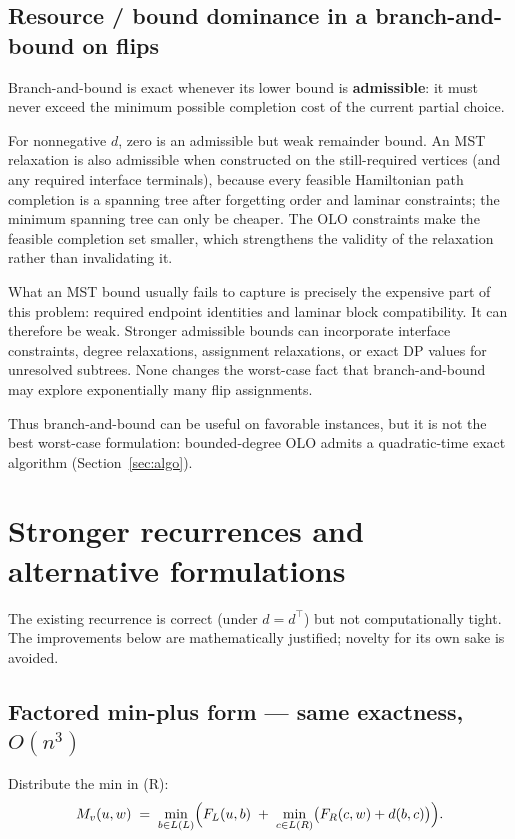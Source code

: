 \documentclass[11pt]{article}
\theoremstyle{plain}
\begin{document}
\subsection{Resource / bound dominance in a branch-and-bound on flips}

Branch-and-bound is exact whenever its lower bound is \textbf{admissible}: it
must never exceed the minimum possible completion cost of the current partial
choice.

For nonnegative \(d\), zero is an admissible but weak remainder bound. An MST
relaxation is also admissible when constructed on the still-required vertices
(and any required interface terminals), because every feasible Hamiltonian path
completion is a spanning tree after forgetting order and laminar constraints;
the minimum spanning tree can only be cheaper. The OLO constraints make the
feasible completion set smaller, which strengthens the validity of the
relaxation rather than invalidating it.

What an MST bound usually fails to capture is precisely the expensive part of
this problem: required endpoint identities and laminar block compatibility. It
can therefore be weak. Stronger admissible bounds can incorporate interface
constraints, degree relaxations, assignment relaxations, or exact DP values for
unresolved subtrees. None changes the worst-case fact that branch-and-bound may
explore exponentially many flip assignments.

Thus branch-and-bound can be useful on favorable instances, but it is not the
best worst-case formulation: bounded-degree OLO admits a quadratic-time exact
algorithm (Section~\ref{sec:algo}).


\section{Stronger recurrences and alternative formulations}

The existing recurrence is correct (under \(d=d^\top\)) but not computationally
tight. The improvements below are mathematically justified; novelty for its own
sake is avoided.

\subsection{Factored min-plus form --- same exactness, \(O(n^3)\)}

Distribute the min in (R):
\begin{equation}
\label{eq:R3}
M_v(u,w)
\;=\;
\min_{b \in L(L)}
\Bigl(
F_L(u,b)
\;+\;
\min_{c \in L(R)}\bigl(F_R(c,w) + d(b,c)\bigr)
\Bigr).
\end{equation}
\end{document}
